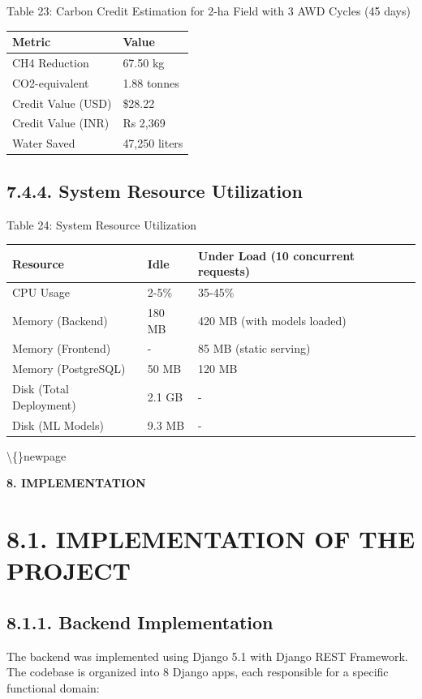 \documentclass[12pt, a4paper]{report}
\begin{document}
Table 23: Carbon Credit Estimation for 2-ha Field with 3 AWD Cycles (45 days)

\begin{table}[htbp]
\centering
\small
\begin{tabularx}{\textwidth}{|X|X|}
\hline
Metric & Value \\
\hline
CH4 Reduction & 67.50 kg \\
CO2-equivalent & 1.88 tonnes \\
Credit Value (USD) & \$28.22 \\
Credit Value (INR) & Rs 2,369 \\
Water Saved & 47,250 liters \\
\hline
\end{tabularx}
\end{table}

\subsection{7.4.4. System Resource Utilization}
Table 24: System Resource Utilization

\begin{table}[htbp]
\centering
\small
\begin{tabularx}{\textwidth}{|X|X|X|}
\hline
Resource & Idle & Under Load (10 concurrent requests) \\
\hline
CPU Usage & 2-5\% & 35-45\% \\
Memory (Backend) & 180 MB & 420 MB (with models loaded) \\
Memory (Frontend) & - & 85 MB (static serving) \\
Memory (PostgreSQL) & 50 MB & 120 MB \\
Disk (Total Deployment) & 2.1 GB & - \\
Disk (ML Models) & 9.3 MB & - \\
\hline
\end{tabularx}
\end{table}

\textbackslash\{\}newpage

\begin{center}
{\fontsize{14}{17}\bfseries 8. IMPLEMENTATION}\\
\end{center}
\section{8.1. IMPLEMENTATION OF THE PROJECT}
\subsection{8.1.1. Backend Implementation}
The backend was implemented using Django 5.1 with Django REST Framework. The codebase is organized into 8 Django apps, each responsible for a specific functional domain:
\end{document}
